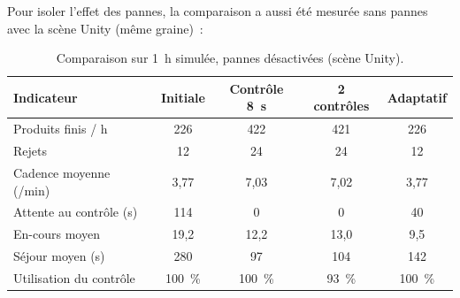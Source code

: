 Pour isoler l'effet des pannes, la comparaison a aussi été mesurée sans pannes avec la scène Unity (même graine)~:

\begin{table}[H]
\centering
\caption{Comparaison sur 1~h simulée, pannes désactivées (scène Unity).}
\label{tab:sans_pannes}
\begin{tabular}{@{}lcccc@{}}
\toprule
\textbf{Indicateur} & \textbf{Initiale} & \textbf{Contrôle 8~s} & \textbf{2 contrôles} & \textbf{Adaptatif} \\
\midrule
Produits finis / h & 226 & 422 & 421 & 226 \\
Rejets & 12 & 24 & 24 & 12 \\
Cadence moyenne (/min) & 3,77 & 7,03 & 7,02 & 3,77 \\
Attente au contrôle (s) & 114 & 0 & 0 & 40 \\
En-cours moyen & 19,2 & 12,2 & 13,0 & 9,5 \\
Séjour moyen (s) & 280 & 97 & 104 & 142 \\
Utilisation du contrôle & 100~\% & 100~\% & 93~\% & 100~\% \\
\bottomrule
\end{tabular}
\end{table}
